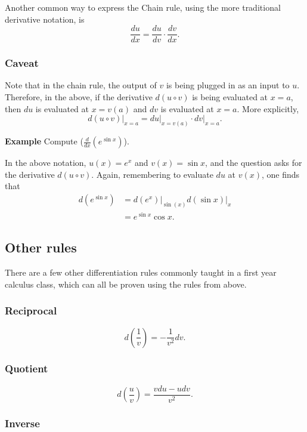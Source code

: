 \documentclass[twoside,openright,titlepage,a4paper]{book}
\begin{document}
\begin{sloppypar}
Another common way to express the Chain rule, using the more traditional derivative notation, is
\begin{equation*}
\frac{du}{dx} = \frac{du}{dv}\cdot \frac{dv}{dx}.
\end{equation*}

\subsubsection{Caveat}

Note that in the chain rule, the output of $v$ is being plugged in as an input to $u$. Therefore, in the above, if the derivative $d(u \circ v)$ is being evaluated at $x=a$, then $du$ is evaluated at $x=v(a)$ and $dv$ is evaluated at $x=a$. More explicitly, \[ d(u \circ v) \bigg|_{x=a} = du \bigg|_{x=v(a)} \cdot dv \bigg|_{x=a}. \]

\textbf{Example} Compute ($ \frac{d}{dx}\left(e^{\sin x}\right)$).
\begin{examplebox}
In the above notation, $u(x) = e^x$ and $v(x) = \sin x$, and the question asks for the derivative $d(u \circ v)$. Again, remembering to evaluate $du$ at $v(x)$, one finds that
\begin{align*} 
d\left(e^{\sin x}\right) &= d(e^x) \bigg|_{\sin(x)} d(\sin x)\bigg|_{x} \\
&= e^{\sin x} \cos x. 
\end{align*}
\end{examplebox}

\subsection{Other rules}

There are a few other differentiation rules commonly taught in a first year calculus class, which can all be proven using the rules from above.

\subsubsection{Reciprocal}
\[ d \left(\frac{1}{v}\right) = - \frac{1}{v^2} dv. \] 

\subsubsection{Quotient}

 \[ d \left(\frac{u}{v}\right) = \frac{vdu - udv}{v^2}. \]

\subsubsection{Inverse}


\end{sloppypar}
\end{document}
